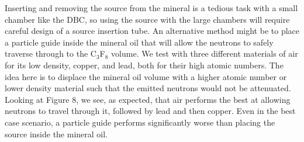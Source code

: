 \documentclass[%
12pt,
twoside,
reprint,
amsmath,amssymb,
aps,
]{article}
\begin{document}
	\par Inserting and removing the source from the mineral is a tedious task with a small chamber like the DBC, so using the source with the large chambers will require careful design of a source insertion tube. An alternative method might be to place a particle guide inside the mineral oil that will allow the neutrons to safely traverse through to the C$_{3}$F$_{8}$ volume. We test with three different materials of air for its low density, copper, and lead, both for their high atomic numbers. The idea here is to displace the mineral oil volume with a higher atomic number or lower density material such that the emitted neutrons would not be attenuated. Looking at Figure 8, we see, as expected, that air performs the best at allowing neutrons to travel through it, followed by lead and then copper. Even in the best case scenario, a particle guide performs significantly worse than placing the source inside the mineral oil.
\end{document}
